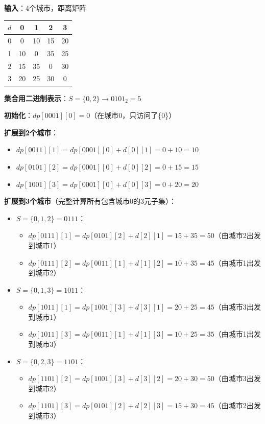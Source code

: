 \documentclass[12pt, a4paper]{ctexart}
\begin{document}
\begin{blackboard}

\textbf{输入}：4个城市，距离矩阵

\begin{center}
\begin{tabular}{c|cccc}
$d$ & 0 & 1 & 2 & 3 \\
\hline
0 & 0 & 10 & 15 & 20 \\
1 & 10 & 0 & 35 & 25 \\
2 & 15 & 35 & 0 & 30 \\
3 & 20 & 25 & 30 & 0 \\
\end{tabular}
\end{center}

\textbf{集合用二进制表示}：$S = \{0, 2\} \to 0101_2 = 5$

\textbf{初始化}：$dp[0001][0] = 0$（在城市0，只访问了\{0\}）

\textbf{扩展到2个城市}：
\begin{itemize}
    \item $dp[0011][1] = dp[0001][0] + d[0][1] = 0 + 10 = 10$
    \item $dp[0101][2] = dp[0001][0] + d[0][2] = 0 + 15 = 15$
    \item $dp[1001][3] = dp[0001][0] + d[0][3] = 0 + 20 = 20$
\end{itemize}

\textbf{扩展到3个城市}（完整计算所有包含城市0的3元子集）：
\begin{itemize}
    \item \textbf{$S=\{0,1,2\}=0111$}：
    \begin{itemize}
        \item $dp[0111][1] = dp[0101][2] + d[2][1] = 15 + 35 = 50$（由城市2出发到城市1）
        \item $dp[0111][2] = dp[0011][1] + d[1][2] = 10 + 35 = 45$（由城市1出发到城市2）
    \end{itemize}
    \item \textbf{$S=\{0,1,3\}=1011$}：
    \begin{itemize}
        \item $dp[1011][1] = dp[1001][3] + d[3][1] = 20 + 25 = 45$（由城市3出发到城市1）
        \item $dp[1011][3] = dp[0011][1] + d[1][3] = 10 + 25 = 35$（由城市1出发到城市3）
    \end{itemize}
    \item \textbf{$S=\{0,2,3\}=1101$}：
    \begin{itemize}
        \item $dp[1101][2] = dp[1001][3] + d[3][2] = 20 + 30 = 50$（由城市3出发到城市2）
        \item $dp[1101][3] = dp[0101][2] + d[2][3] = 15 + 30 = 45$（由城市2出发到城市3）
    \end{itemize}
\end{itemize}

\end{blackboard}
\end{document}
